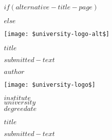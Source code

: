 \documentclass[a4paper, $if(page-layout)$$page-layout$$endif$]{templates/ociamthesis}
\begin{document}
\begin{romanpages}

$if(alternative-title-page)$

$else$
\begin{titlepage}

\texttt{[image: \$university-logo-alt\$]}
   
   \begin{center}
       \vspace*{1cm}

       {\huge \textbf{$title$}}

            
       \vspace{1.5cm}
       
       $submitted-text$

       {\large \textbf{$author$}}
       \vspace{0.8cm}
       
       \vfill
       
       \texttt{[image: \$university-logo\$]}
            
       \vspace{0.8cm}
     
            
       $institute$ \\
       $university$ \\
       $degreedate$
            
   \end{center}
\end{titlepage}

\begin{titlepage}

   \begin{center}
       \vspace*{1cm}

       {\huge \textbf{$title$}}

            
       \vspace{1.5cm}
       
       $submitted-text$
       \vspace{2cm}


\end{center}
\end{titlepage}
\end{romanpages}
\end{document}
